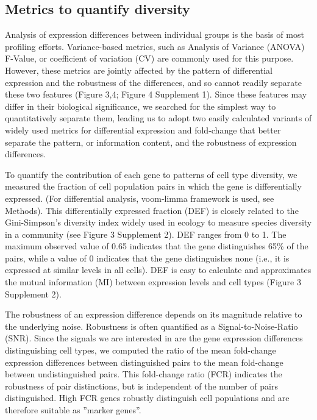 \subsection{Metrics to quantify diversity}
Analysis of expression differences between individual groups is the basis of most profiling efforts. Variance-based metrics, such as Analysis of Variance (ANOVA) F-Value, or coefficient of variation (CV) are commonly used for this purpose. However, these metrics are jointly affected by the pattern of differential expression and the robustness of the differences, and so cannot readily separate these two features (Figure 3,4; Figure 4 Supplement 1). Since these features may differ in their biological significance, we searched for the simplest way to quantitatively separate them, leading us to adopt two easily calculated variants of widely used metrics for differential expression and fold-change that better separate the pattern, or information content, and the robustness of expression differences.

To quantify the contribution of each gene to patterns of cell type diversity, we measured the fraction of cell population pairs in which the gene is differentially expressed. (For differential analysis, voom-limma framework is used, see Methods). This differentially expressed fraction (DEF) is closely related to the Gini-Simpson's diversity index \citep{Simpson_1949} widely used in ecology to measure species diversity in a community (see Figure 3 Supplement 2). DEF ranges from 0 to 1. The maximum observed value of 0.65 indicates that the gene distinguishes 65\% of the pairs, while a value of 0 indicates that the gene distinguishes none (i.e., it is expressed at similar levels in all cells). DEF is easy to calculate and approximates the mutual information (MI) between expression levels and cell types (Figure 3 Supplement 2). 

The robustness of an expression difference depends on its magnitude relative to the underlying noise. Robustness is often quantified as a Signal-to-Noise-Ratio (SNR). Since the signals we are interested in are the gene expression differences distinguishing cell types, we computed the ratio of the mean fold-change expression differences between distinguished pairs to the mean fold-change between undistinguished pairs. This fold-change ratio (FCR) indicates the robustness of pair distinctions, but is independent of the number of pairs distinguished. High FCR genes robustly distinguish cell populations and are therefore suitable as ”marker genes”. %

